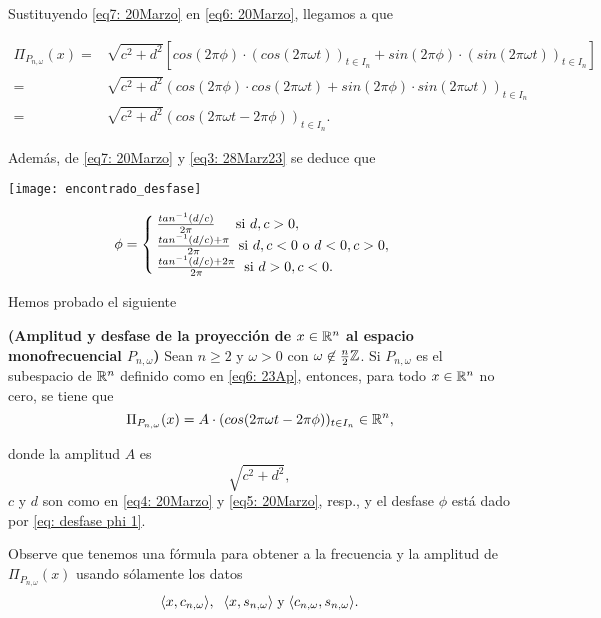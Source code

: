 \noindent 
Sustituyendo \eqref{eq7: 20Marzo} en \eqref{eq6: 20Marzo},
llegamos a que

\begin{align*}
\Pi_{P_{n, \omega}}(x) = & 
\sqrt{c^{2}+d^{2}} \left[
cos(2 \pi \phi) \cdot (cos (2 \pi \omega t))_{t \in I_{n}} +
sin(2 \pi \phi) \cdot (sin (2 \pi \omega t))_{t \in I_{n}} 
\right] \\
= & 
\sqrt{c^{2}+d^{2}} 
(cos(2 \pi \phi) \cdot cos (2 \pi \omega t) +
sin(2 \pi \phi) \cdot sin (2 \pi \omega t) )_{t \in I_{n}} \\
= & 
\sqrt{c^{2}+d^{2}} 
(cos(2 \pi \omega t - 2 \pi \phi))_{t \in I_{n}}.
\end{align*}

\noindent
Además, de \eqref{eq7: 20Marzo} y \eqref{eq3: 28Marz23}
se deduce que
\begin{marginfigure}
\texttt{[image: encontrado\_desfase]} 
\end{marginfigure}
\begin{equation}
\label{eq: desfase phi 1}
\phi =
\begin{cases}
\frac{tan^{-1}(d/c) }{2 \pi}  \hspace{0.4cm}    \text{   si }   d, c > 0,  \\
\frac{tan^{-1}(d/c) + \pi }{2 \pi} \hspace{0.2cm}  \text{si }  d, c < 0
\text{ o } d<0, c>0, \\
\frac{tan^{-1}(d/c) + 2\pi }{2 \pi} \hspace{0.2cm}  \text{si }  d>0,  c < 0. 
\end{cases}
\end{equation}


Hemos probado el siguiente
\begin{teo}
\label{teo: amelie1}
\textbf{(Amplitud y desfase de la proyección de $x \in \mathbb{R}^{n}$ al
espacio monofrecuencial $P_{n, \omega}$)}
Sean $n \geq 2$ y $\omega > 0$ con $\omega \not\in \frac{n}{2}\mathbb{Z}$.
Si $P_{n, \omega}$ es el subespacio de $\mathbb{R}^{n}$ definido como 
en \eqref{eq6: 23Ap}, entonces, para todo 
$x \in \mathbb{R}^{n}$ no cero, se tiene que
\begin{equation}
\label{ec: desfase explicito 1}
\Pi_{P_{n, \omega}} (x) = A \cdot (
cos (2 \pi \omega t - 2 \pi \phi)
)_{t \in I_{n}} \in \mathbb{R}^{n},
\end{equation}

\noindent
donde la amplitud $A$ es
\[
\sqrt{c^{2}+d^{2}},
\]
$c$ y $d$ son como en \eqref{eq4: 20Marzo} y 
\eqref{eq5: 20Marzo}, resp., y el desfase $\phi$ está 
dado por \eqref{eq: desfase phi 1}.
\end{teo}
Observe que tenemos una fórmula para obtener a
la frecuencia y la amplitud de $\Pi_{P_{n, \omega}}(x)$
usando sólamente los datos
\[
\langle x, c_{n, \omega} \rangle, \hspace{0.2cm}
\langle x, s_{n, \omega} \rangle \hspace{0.1cm} \text{y} \hspace{0.1cm}
\langle c_{n, \omega}, s_{n, \omega} \rangle.
\]

